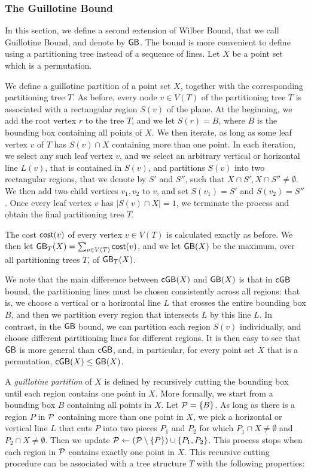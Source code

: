 \documentclass[11pt]{article}
\numberwithin{equation}{section}
\theoremstyle{definition}
\theoremstyle{plain}
\begin{document}
\subsubsection{The Guillotine Bound}

In this section, we define a second extension of Wilber Bound, that we call Guillotine Bound, and denote by $\mathsf{GB}$. The bound is more convenient to define using a partitioning tree instead of a sequence of lines. 
Let $X$ be a point set which is a permutation.  

We define a guillotine partition of a point set $X$, together with the corresponding partitioning tree $T$. 
As before, every node $v\in V(T)$ of the partitioning tree $T$ is associated with a rectangular region $S(v)$ of the plane. At the beginning, we add the root vertex $r$ to the tree $T$, and we let $S(r)=B$, where $B$ is the bounding box containing all points of $X$. We then iterate, as long as some leaf vertex $v$ of $T$ has $S(v)\cap X$ containing more than one point. In each iteration, we select any such leaf vertex $v$, and we select an arbitrary vertical or horizontal line $L(v)$, that is contained in $S(v)$, and partitions $S(v)$ into two rectangular regions, that we denote by $S'$ and $S''$, such that $X\cap S',X\cap S''\neq \emptyset$. We then add two child vertices $v_1,v_2$ to $v$, and set $S(v_1)=S'$ and $S(v_2)=S''$. Once every leaf vertex $v$ has $|S(v)\cap X|=1$, we terminate the process and obtain the final partitioning tree $T$.

The cost $\mathsf{cost}(v)$ of every vertex $v\in V(T)$ is calculated exactly as before. We then let $\mathsf{GB}_T(X)=\sum_{v\in V(T)}\mathsf{cost}(v)$, and we let $\mathsf{GB}(X)$ be the maximum, over all partitioning trees $T$, of $\mathsf{GB}_T(X)$. 

We note that the main difference between $\mathsf{cGB}(X)$ and $\mathsf{GB}(X)$ is that in $\mathsf{cGB}$ bound, the partitioning lines must be chosen consistently across all regions: that is, we choose a vertical or a horizontal line $L$ that crosses the entire bounding box $B$, and then we partition every region that intersects $L$ by this line $L$. In contrast, in the $\mathsf{GB}$ bound, we can partition each region $S(v)$ individually, and choose different partitioning lines for different regions. It is then easy to see that $\mathsf{GB}$ is more general than $\mathsf{cGB}$, and, in particular, for every point set $X$ that is a permutation, $\mathsf{cGB}(X)\leq \mathsf{GB}(X)$.

\iffalse

A \emph{guillotine partition} of $X$ is defined by recursively cutting the bounding box until each region contains one point in $X$. 
More formally, we start from a bounding box $B$ containing all points in $X$. 
Let ${\mathcal P} = \{B\}$. 
As long as there is a region $P$ in ${\mathcal P}$ containing more than one point in $X$, we pick a horizontal or vertical line $L$ that cuts $P$ into two pieces $P_1$ and $P_2$ for which $P_1 \cap X \neq \emptyset$ and $P_2 \cap X \neq \emptyset$.
Then we update ${\mathcal P} \leftarrow ({\mathcal P} \setminus \{P\}) \cup \{P_1, P_2 \}$.   
This process stops when each region in ${\mathcal P}$ contains exactly one point in $X$. 
This recursive cutting procedure can be associated with a tree structure $T$ with the following properties: 
\end{document}
